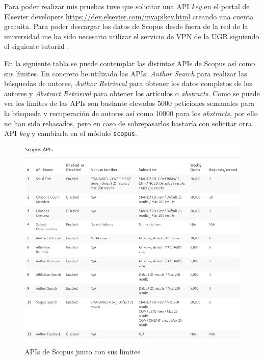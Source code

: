 Para poder realizar mis pruebas tuve que solicitar una \acrshort{API} \textit{key} en el portal de Elsevier developers \url{https://dev.elsevier.com/myapikey.html} creando una cuenta gratuita. Para poder descargar los datos de Scopus desde fuera de la red de la universidad me ha sido necesario utilizar el servicio de \acrshort{VPN} de la \acrshort{UGR} siguiendo el siguiente tutorial \cite{vpnUGR}.

En la siguiente tabla se puede contemplar las distintas \acrshort{API}s de Scopus así como sus límites. En concreto he utilizado las \acrshort{API}s: \textit{Author Search} para realizar las búsquedas de autores, \textit{Author Retrieval} para obtener los datos completos de los autores y \textit{Abstract Retrieval} para obtener los artículos o \textit{abstracts}. 
Como se puede ver los límites de las \acrshort{API}s son bastante elevados 5000 peticiones semanales para la búsqueda y recuperación de autores así como 10000 para los \textit{abstracts}, por ello no han sido rebasados, pero en caso de sobrepasarlos bastaría con solicitar otra \acrshort{API} \textit{key} y cambiarla en el módulo \texttt{scopus}.

\begin{figure}[h]
	
	\centering
	\includegraphics[width=\linewidth]{imagenes/scopusAPIs}
	\caption{ \acrshort{API}s de Scopus junto con sus límites}
\end{figure}
